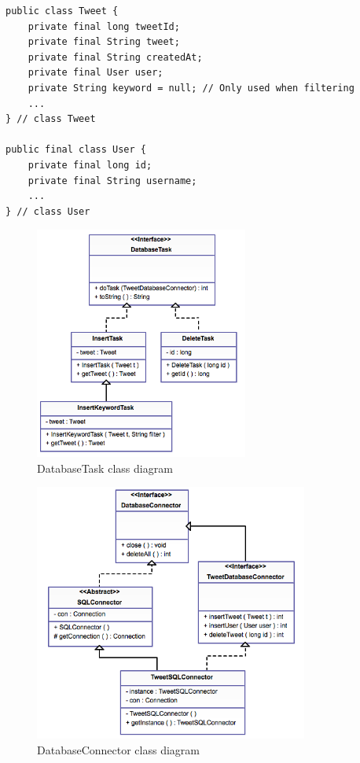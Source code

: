 \begin{lstlisting}[caption=Tweet and User class properties, label=lst:tweetuser]
public class Tweet {
    private final long tweetId;
    private final String tweet;
    private final String createdAt;
    private final User user;
    private String keyword = null; // Only used when filtering
    ...
} // class Tweet

public final class User {
    private final long id;
    private final String username;
    ...
} // class User 
\end{lstlisting}

\begin{figure}[h]
\begin{center}
\includegraphics[width=7cm]{dbtask}
\end{center}
\caption{DatabaseTask class diagram}
\label{fig:dbtask}
\end{figure}

\begin{figure}[h]
\begin{center}
\includegraphics[width=9cm]{dbcon}
\end{center}
\caption{DatabaseConnector class diagram}
\label{fig:dbcon}
\end{figure}

